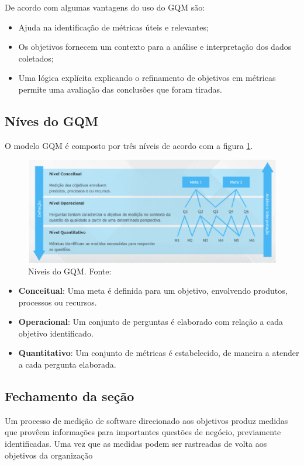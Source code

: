 De acordo com \cite{differding} algumas vantagens do uso do GQM são:

\begin{itemize}
  \item Ajuda na identificação de métricas úteis e relevantes;
  \item Os objetivos fornecem um contexto para a análise e interpretação dos dados coletados;
  \item Uma lógica explícita explicando o refinamento de objetivos em métricas permite uma avaliação das conclusões que foram tiradas.
\end{itemize}

\subsection{Níves do GQM}

O modelo GQM é composto por três níveis de acordo com a figura \ref{fig:gqm1}.

\begin{figure}[h!]
	\centering
  \includegraphics[keepaspectratio=true,scale=0.5]{figuras/gqm.eps}
  \caption[Níveis do GQM.]{Níveis do GQM. Fonte: \cite{junior}}
	\label{fig:gqm1}
\end{figure}

\begin{itemize}
  \item \textbf{Conceitual}: Uma meta é definida para um objetivo, envolvendo produtos, processos ou recursos.
  \item \textbf{Operacional}: Um conjunto de perguntas é elaborado com relação a cada objetivo identificado.
  \item \textbf{Quantitativo}: Um conjunto de métricas é estabelecido, de maneira a atender a cada pergunta elaborada.
\end{itemize}

\subsection{Fechamento da seção}

Um processo de medição de software direcionado aos objetivos produz medidas que provêem informações para importantes questões de negócio, previamente identificadas. Uma vez que as medidas podem ser rastreadas de volta aos objetivos da organização \cite{junior}
